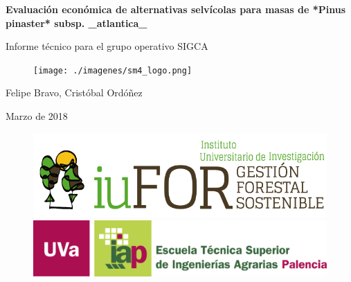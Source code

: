 \usepackage{float}
\usepackage{longtable}
\usepackage[spanish]{babel}
\usepackage{eurosym}

\begin{titlepage}
  \begin{center}

    \begin{spacing}{0.51}
      \textbf{\huge Evaluación económica de alternativas selvícolas para masas de *Pinus pinaster* subsp. _atlantica_  } 
      \vspace*{\fill}
    \end{spacing}
    
    \begin{spacing}{0.51}
      {\large   Informe técnico para el grupo operativo SIGCA }
      \vspace*{\fill}
    \end{spacing}

    \begin{figure}[ht]
      \centering      
      \texttt{[image: ./imagenes/sm4\_logo.png]}
    \end{figure}
    
    \begin{spacing}{0.51}
      \textcolor{other}
      Felipe Bravo, Cristóbal Ordóñez  \\ [0.5cm]
      \vspace*{\fill}
    \end{spacing}
      
    \begin{spacing}{0.51}
      Marzo de 2018 \\
      \vspace*{\fill}
    \end{spacing}

  \end{center}

  \begin{figure}[]
    
    \centering
    \includegraphics[scale=0.273]{./imagenes/iuFOR.png}  
    \includegraphics[scale=1.5]{./imagenes/etsiiaa.png}
  \end{figure}


\end{titlepage}

